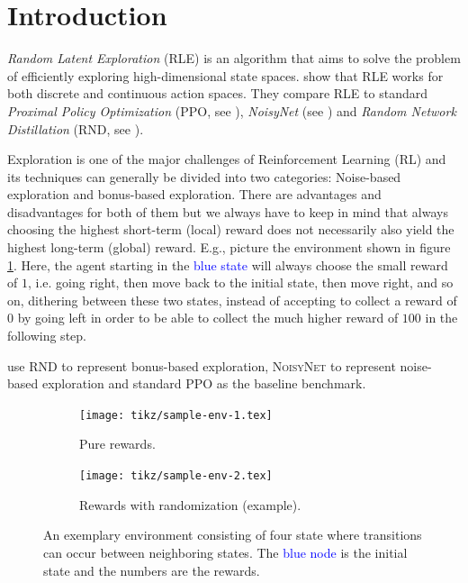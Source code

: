 \documentclass[10pt]{article} %
\begin{document}
\section{Introduction}
\textit{Random Latent Exploration} (\textsc{RLE}) is an algorithm that aims to solve the problem of efficiently exploring high-dimensional state spaces. \cite{rle-paper} show that RLE works for both discrete and continuous action spaces. They compare \textsc{RLE} to standard \textit{Proximal Policy Optimization} (\textsc{PPO}, see \cite{ppo-paper}), \textit{NoisyNet} (see \cite{noisynet-paper}) and \textit{Random Network Distillation} (\textsc{RND}, see \cite{rnd-paper}).

\noindent Exploration is one of the major challenges of Reinforcement Learning (RL) and its techniques can generally be divided into two categories: Noise-based exploration and bonus-based exploration. There are advantages and disadvantages for both of them but we always have to keep in mind that always choosing the highest short-term (local) reward does not necessarily also yield the highest long-term (global) reward. E.g., picture the environment shown in figure \ref{fig:sample-env-1}. Here, the agent starting in the \textcolor{blue}{blue state} will always choose the small reward of $1$, i.e. going right, then move back to the initial state, then move right, and so on, dithering between these two states, instead of accepting to collect a reward of $0$ by going left in order to be able to collect the much higher reward of $100$ in the following step.

\noindent \cite{rle-paper} use \textsc{RND} to represent bonus-based exploration, \textsc{NoisyNet} to represent noise-based exploration and standard \textsc{PPO} as the baseline benchmark.

\begin{figure}[h!]
  \centering
  \begin{subfigure}[b]{0.45\textwidth}
    \centering
    \texttt{[image: tikz/sample-env-1.tex]}
    \caption{Pure rewards.}
    \label{fig:sample-env-1}
  \end{subfigure}
  \hfill
  \begin{subfigure}[b]{0.45\textwidth}
    \centering
    \texttt{[image: tikz/sample-env-2.tex]}
    \caption{Rewards with randomization (example).}
    \label{fig:sample-env-2}
  \end{subfigure}
  
  \caption{An exemplary environment consisting of four state where transitions can occur between neighboring states. The \textcolor{blue}{blue node} is the initial state and the numbers are the rewards.}
  \label{fig:sample-env}
\end{figure}
\end{document}
